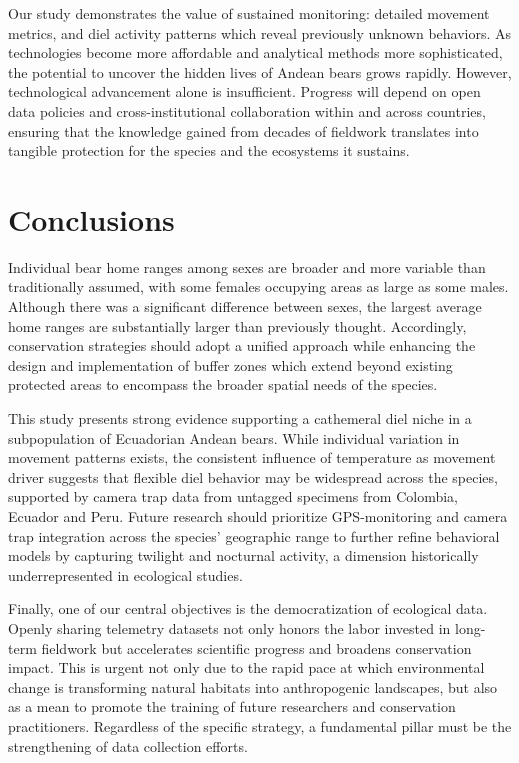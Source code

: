 \documentclass[lineno,referee,pdflatex,sn-vancouver-num]{sn-jnl}%
\theoremstyle{thmstyleone}%
\theoremstyle{thmstyletwo}%
\theoremstyle{thmstylethree}%
\begin{document}
Our study demonstrates the value of sustained monitoring: detailed movement metrics, and diel activity patterns which reveal previously unknown behaviors. As technologies become more affordable and analytical methods more sophisticated, the potential to uncover the hidden lives of Andean bears grows rapidly.
However, technological advancement alone is insufficient. Progress will depend on open data policies and cross-institutional collaboration within and across countries, ensuring that the knowledge gained from decades of fieldwork translates into tangible protection for the species and the ecosystems it sustains.

\section{Conclusions}

Individual bear home ranges among sexes are broader and more variable than traditionally assumed, with some females occupying areas as large as some males. Although there was a significant difference between sexes, the largest average home ranges are substantially larger than previously thought. Accordingly, conservation strategies should adopt a unified approach while enhancing the design and implementation of buffer zones which extend beyond existing protected areas to encompass the broader spatial needs of the species.

This study presents strong evidence supporting a cathemeral diel niche in a subpopulation of Ecuadorian Andean bears. While individual variation in movement patterns exists, the consistent influence of temperature as movement driver suggests that flexible diel behavior may be widespread across the species, supported by camera trap data from untagged specimens from Colombia, Ecuador and Peru.
Future research should prioritize GPS-monitoring and camera trap integration across the species' geographic range to further refine behavioral models by capturing twilight and nocturnal activity, a dimension historically underrepresented in ecological studies.

Finally, one of our central objectives is the democratization of ecological data. Openly sharing telemetry datasets not only honors the labor invested in long-term fieldwork but accelerates scientific progress and broadens conservation impact.
This is urgent not only due to the rapid pace at which environmental change is transforming natural habitats into anthropogenic landscapes, but also as a mean to promote the training of future researchers and conservation practitioners.
Regardless of the specific strategy, a fundamental pillar must be the strengthening of data collection efforts.
\end{document}
